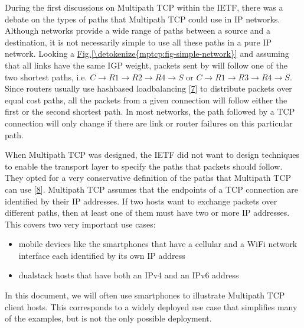 \documentclass[letterpaper,10pt,english]{sphinxmanual}
\begin{document}
During the first discussions on Multipath TCP within the IETF, there was a debate on the types of paths that Multipath TCP could use in IP networks. Although networks provide a wide range of paths between a source and a destination, it is not necessarily simple to use all these paths in a pure IP network. Looking a \hyperref[\detokenize{mptcp:fig-simple-network}]{Fig.\@ \ref{\detokenize{mptcp:fig-simple-network}}} and assuming that all links have the same IGP weight, packets sent by  will follow one of the two shortest paths, i.e. \(C \rightarrow R1 \rightarrow R2 \rightarrow R4 \rightarrow S\) or \(C \rightarrow R1 \rightarrow R3 \rightarrow R4 \rightarrow S\). Since routers usually use hash\sphinxhyphen{}based load\sphinxhyphen{}balancing {[}\hyperlink{cite.biblio:id2922}{7}{]} to distribute packets over equal cost paths, all the packets from a given connection will follow either the first or the second shortest path. In most networks, the path followed by a TCP connection will only change if there are link or router failures on this particular path.

\sphinxAtStartPar
When Multipath TCP was designed, the IETF did not want to design techniques to enable the transport layer to specify the paths that packets should follow. They opted for a very conservative definition of the paths that Multipath TCP can use {[}\hyperlink{cite.biblio:id6033}{8}{]}. Multipath TCP assumes that the endpoints of a TCP connection are identified by their IP addresses. If two hosts want to exchange packets over different paths, then at least one of them must have two or more IP addresses. This covers two very important use cases:
\begin{itemize}
\item {} 
\sphinxAtStartPar
mobile devices like the smartphones that have a cellular and a Wi\sphinxhyphen{}Fi network interface each identified by its own IP address

\item {} 
\sphinxAtStartPar
dual\sphinxhyphen{}stack hosts that have both an IPv4 and an IPv6 address

\end{itemize}

\sphinxAtStartPar
In this document, we will often use smartphones to illustrate Multipath TCP client hosts. This corresponds to a widely deployed use case that simplifies many of the examples, but is not the only possible deployment.
\end{document}
